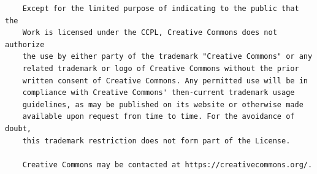 \documentclass[10pt]{book}              %
\begin{document}
\begin{appendices}
\begin{verbatim}
    Except for the limited purpose of indicating to the public that the
    Work is licensed under the CCPL, Creative Commons does not authorize
    the use by either party of the trademark "Creative Commons" or any
    related trademark or logo of Creative Commons without the prior
    written consent of Creative Commons. Any permitted use will be in
    compliance with Creative Commons' then-current trademark usage
    guidelines, as may be published on its website or otherwise made
    available upon request from time to time. For the avoidance of doubt,
    this trademark restriction does not form part of the License.

    Creative Commons may be contacted at https://creativecommons.org/.
	\end{verbatim}
\end{appendices}


\printindex
\end{document}
